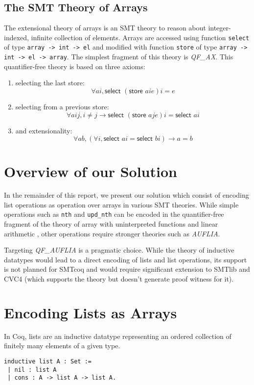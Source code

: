 \documentclass[10pt]{article}
\begin{document}
\subsection{The SMT Theory of Arrays}
The extensional theory of arrays is an SMT theory to reason about integer-indexed, infinite collection of elements. Arrays are accessed using function \lstinline|select| of type \lstinline|array -> int -> el| and modified with function \lstinline|store| of type \lstinline|array -> int -> el -> array|. The simplest fragment of this theory is \emph{QF\_AX}. This quantifier-free theory is based on three axioms:
\begin{enumerate}
\item selecting the last store:
$$ \forall a i, \textsf{select } (\textsf{store } a i e) i = e$$
\item selecting from a previous store:
$$ \forall a i j, i \neq j \to \textsf{select } (\textsf{store } a j e) i = \textsf{select } a i$$
\item and extensionality:
$$ \forall a b, (\forall i, \textsf{select } a i = \textsf{select } b i) \to a = b$$
\end{enumerate}

\section{Overview of our Solution}

In the remainder of this report, we present our solution which consist of encoding list operations as operation over arrays in various SMT theories. While simple operations such as \lstinline|nth| and \lstinline|upd_nth| can be encoded in the quantifier-free fragment of the theory of array with uninterpreted functions and linear arithmetic , other operations require stronger theories such as \emph{AUFLIA}. 

Targeting \emph{QF_AUFLIA} is a pragmatic choice. While the theory of inductive datatypes would lead to a direct encoding of lists and list operations, its support is not planned for SMTcoq and would require significant extension to SMTlib and CVC4 (which supports the theory but doesn't generate proof witness for it). 


\section{Encoding Lists as Arrays}

In Coq, lists are an inductive datatype representing an ordered collection of finitely many elements of a given type. 
\begin{lstlisting}
inductive list A : Set :=
 | nil : list A
 | cons : A -> list A -> list A.
\end{lstlisting}
\end{document}
